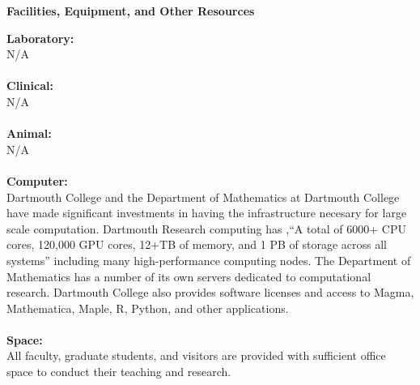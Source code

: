 \documentclass[12pt]{amsart}
\begin{document}
\begin{center}
\textbf{Facilities, Equipment, and Other Resources}
\end{center}

\vspace{1cm}
\textbf{Laboratory:}\\
N/A
\\
\\
\textbf{Clinical:}\\
N/A
\\
\\
\textbf{Animal:}\\
N/A
\\
\\
\textbf{Computer:}\\
Dartmouth College and the Department of Mathematics at Dartmouth College have made significant investments in having the infrastructure necesary for large scale computation. Dartmouth Research computing has ,``A total of 6000+ CPU cores, 120,000 GPU cores, 12+TB of memory, and 1 PB of storage across all systems'' including many high-performance computing nodes. The Department of Mathematics has a number of its own servers dedicated to computational research. Dartmouth College also provides software licenses and access to Magma, Mathematica, Maple, R, Python, and other applications. 
\\
\\
\textbf{Space:}\\
All faculty, graduate students, and visitors are provided with sufficient office space to
conduct their teaching and research.
\\
\\
%
\end{document}
